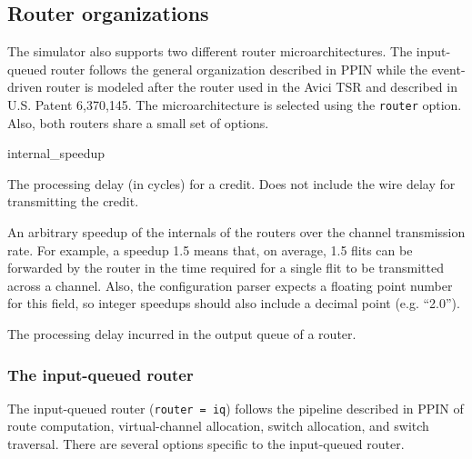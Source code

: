\documentclass[11pt]{article}
\begin{document}
\subsection{Router organizations}

The simulator also supports two different router microarchitectures.
The input-queued router follows the general organization described in
PPIN while the event-driven router is modeled after the router used in
the Avici TSR and described in U.S. Patent 6,370,145.  The
microarchitecture is selected using the \texttt{router} option.  Also,
both routers share a small set of options.

\begin{opt_list}{internal\_speedup}
\item[credit\_delay] The processing delay (in cycles) for a credit.
Does not include the wire delay for transmitting the credit.

\item[internal\_speedup] An arbitrary speedup of the internals of the
routers over the channel transmission rate.  For example, a speedup
1.5 means that, on average, 1.5 flits can be forwarded by the router
in the time required for a single flit to be transmitted across a
channel.  Also, the configuration parser expects a floating point
number for this field, so integer speedups should also include a
decimal point (e.g. ``2.0'').

\item[output\_delay] The processing delay incurred in the output queue
of a router.
\end{opt_list}

\subsubsection{The input-queued router}
\label{sec:iq_router}

The input-queued router (\texttt{router = iq}) follows the pipeline
described in PPIN of route computation, virtual-channel allocation,
switch allocation, and switch traversal.  There are several options
specific to the input-queued router.
\end{document}
